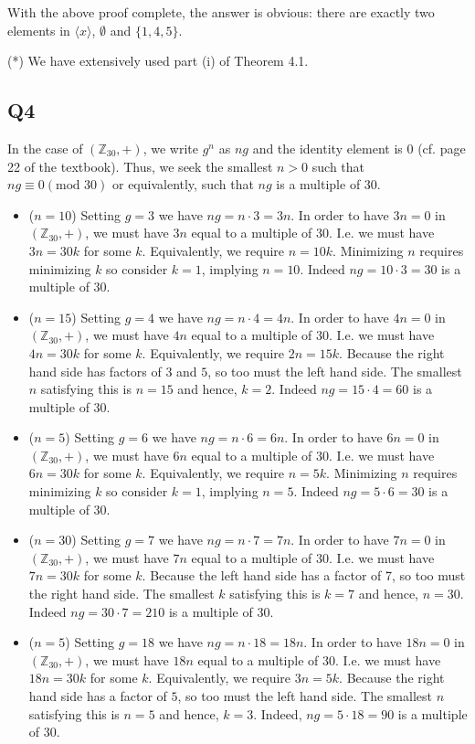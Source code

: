 \documentclass[12pt]{article}
\def\Z{{\mathbb Z}}        %
\numberwithin{theorem}{section}
\numberwithin{equation}{section}
\numberwithin{remark}{section}
\numberwithin{definition}{section}
\numberwithin{theorem}{section}
\numberwithin{lemma}{section}
\numberwithin{example}{section}
\begin{document}
With the above proof complete, the answer is obvious: there are exactly two elements in $\langle x \rangle$, $\emptyset$ and $\{1,4,5\}$. 

\vspace{\baselineskip}

\noindent (*) We have extensively used part (i) of Theorem 4.1.



\subsection{Q4}

In the case of $(\Z_{30},+)$, we write $g^n$ as $ng$ and the identity element is $0$ (cf. page 22 of the textbook). Thus, we seek the smallest $n>0$ such that $ng\equiv0(\text{mod }{30})$ or equivalently, such that $ng$ is a multiple of 30.
\begin{itemize}
	\item{($n=10$) Setting $g=3$ we have $ng=n\cdot3=3n$. In order to have $3n=0$ in $(\Z_{30},+)$, we must have $3n$ equal to a multiple of $30$. I.e. we must have $3n=30k$ for some $k$. Equivalently, we require $n=10k$. Minimizing $n$ requires minimizing $k$ so consider $k=1$, implying $n=10$. Indeed $ng=10\cdot 3=30$ is a multiple of 30.}
	\item{($n=15$) Setting $g=4$ we have $ng=n\cdot4=4n$. In order to have $4n=0$ in $(\Z_{30},+)$, we must have $4n$ equal to a multiple of $30$. I.e. we must have $4n=30k$ for some $k$. Equivalently, we require $2n=15k$. Because the right hand side has factors of $3$ and $5$, so too must the left hand side. The smallest $n$ satisfying this is $n=15$ and hence, $k=2$. Indeed $ng=15\cdot4=60$ is a multiple of 30.}
	\item{($n=5$) Setting $g=6$ we have $ng=n\cdot6=6n$. In order to have $6n=0$ in $(\Z_{30},+)$, we must have $6n$ equal to a multiple of $30$. I.e. we must have $6n=30k$ for some $k$. Equivalently, we require $n=5k$. Minimizing $n$ requires minimizing $k$ so consider $k=1$, implying $n=5$. Indeed $ng=5\cdot 6=30$ is a multiple of 30.}
	\item{($n=30$) Setting $g=7$ we have $ng=n\cdot7=7n$. In order to have $7n=0$ in $(\Z_{30},+)$, we must have $7n$ equal to a multiple of $30$. I.e. we must have $7n=30k$ for some $k$. Because the left hand side has a factor of 7, so too must the right hand side. The smallest $k$ satisfying this is $k=7$ and hence, $n=30$. Indeed $ng=30\cdot7=210$ is a multiple of 30.}
	\item({$n=5$) Setting $g=18$ we have $ng=n\cdot18=18n$. In order to have $18n=0$ in $(\Z_{30},+)$, we must have $18n$ equal to a multiple of $30$. I.e. we must have $18n=30k$ for some $k$. Equivalently, we require $3n=5k$. Because the right hand side has a factor of $5$, so too must the left hand side. The smallest $n$ satisfying this is $n=5$ and hence, $k=3$. Indeed, $ng=5\cdot18=90$ is a multiple of 30.}
\end{itemize}
\end{document}
